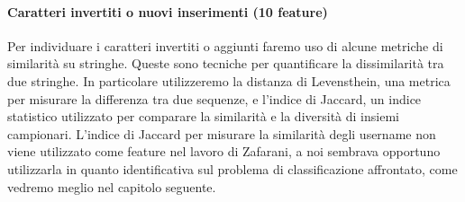 \paragraph{Caratteri invertiti o nuovi inserimenti (10 feature)} Per individuare i caratteri invertiti o aggiunti faremo uso di alcune metriche di similarità su stringhe. Queste sono tecniche per quantificare la dissimilarità tra due stringhe. In particolare utilizzeremo la distanza di Levensthein, una metrica per misurare la differenza tra due sequenze, e l’indice di Jaccard, un indice statistico utilizzato per comparare la similarità e la diversità di insiemi campionari. L'indice di Jaccard per misurare la similarità degli username non viene utilizzato come feature nel lavoro di Zafarani, a noi sembrava opportuno utilizzarla in quanto identificativa sul problema di classificazione affrontato, come vedremo meglio nel capitolo seguente.
